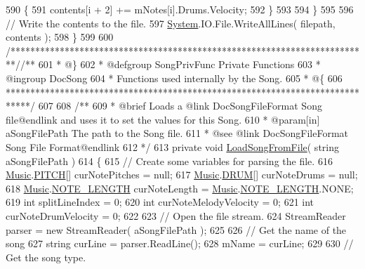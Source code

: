\begin{DoxyCodeInclude}
590             \{
591                 contents[i + 2] += mNotes[i].Drums.Velocity;
592             \}
593 
594         \}
595 
596         \textcolor{comment}{// Write the contents to the file.}
597         \hyperlink{namespace_system}{System}.IO.File.WriteAllLines( filepath, contents );
598     \}
599 
600     \textcolor{comment}{/*************************************************************************/}\textcolor{comment}{/** }
601 \textcolor{comment}{     * @\}}
602 \textcolor{comment}{     * @defgroup SongPrivFunc Private Functions}
603 \textcolor{comment}{     * @ingroup DocSong}
604 \textcolor{comment}{     * Functions used internally by the Song.}
605 \textcolor{comment}{     * @\{}
606 \textcolor{comment}{    *****************************************************************************/}
607 \textcolor{comment}{}
608 \textcolor{comment}{    /**}
609 \textcolor{comment}{     * @brief Loads a @link DocSongFileFormat Song file@endlink and uses it to set the values for this
       Song.  }
610 \textcolor{comment}{     * @param[in] aSongFilePath The path to the Song file.}
611 \textcolor{comment}{     * @see @link DocSongFileFormat Song File Format@endlink}
612 \textcolor{comment}{    */}
613     \textcolor{keyword}{private} \textcolor{keywordtype}{void} \hyperlink{group___song_priv_func_ga5c8edd8f7ebeab0d93f5619a644c30f5}{LoadSongFromFile}( \textcolor{keywordtype}{string} aSongFilePath )
614     \{
615         \textcolor{comment}{// Create some variables for parsing the file.}
616         \hyperlink{class_music}{Music}.\hyperlink{group___music_enums_ga508f69b199ea518f935486c990edac1d}{PITCH}[] curNotePitches = null;
617         \hyperlink{class_music}{Music}.\hyperlink{group___music_enums_gade475b4382c7066d1af13e7c13c029b6}{DRUM}[] curNoteDrums = null;
618         \hyperlink{class_music}{Music}.\hyperlink{group___music_enums_gaf11b5f079adbb21c800b9eca1c5c3cbd}{NOTE\_LENGTH} curNoteLength = \hyperlink{class_music}{Music}.\hyperlink{group___music_enums_gaf11b5f079adbb21c800b9eca1c5c3cbd}{NOTE\_LENGTH}.NONE;
619         \textcolor{keywordtype}{int} splitLineIndex = 0;
620         \textcolor{keywordtype}{int} curNoteMelodyVelocity = 0;
621         \textcolor{keywordtype}{int} curNoteDrumVelocity = 0;
622 
623         \textcolor{comment}{// Open the file stream.}
624         StreamReader parser = \textcolor{keyword}{new} StreamReader( aSongFilePath );
625 
626         \textcolor{comment}{// Get the name of the song}
627         \textcolor{keywordtype}{string} curLine = parser.ReadLine();
628         mName = curLine;
629 
630         \textcolor{comment}{// Get the song type.}

\end{DoxyCodeInclude}
